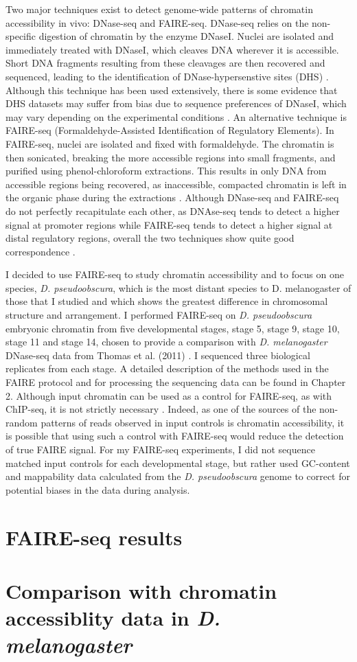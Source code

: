 Two major techniques exist to detect genome-wide patterns of chromatin accessibility in vivo: DNase-seq and FAIRE-seq. DNase-seq relies on the non-specific digestion of chromatin by the enzyme DNaseI. Nuclei are isolated and immediately treated with DNaseI, which cleaves DNA wherever it is accessible. Short DNA fragments resulting from these cleavages are then recovered and sequenced, leading to the identification of DNase-hypersenstive sites (DHS) \citep{thomas_dynamic_2011}. Although this technique has been used extensively, there is some evidence that DHS datasets may suffer from bias due to sequence preferences of DNaseI, which may vary depending on the experimental conditions \citep{koohy_chromatin_2013}. An alternative technique is FAIRE-seq (Formaldehyde-Assisted Identification of Regulatory Elements). In FAIRE-seq, nuclei are isolated and fixed with formaldehyde. The chromatin is then sonicated, breaking the more accessible regions into small fragments, and purified using phenol-chloroform extractions. This results in only DNA from accessible regions being recovered, as inaccessible, compacted chromatin is left in the organic phase during the extractions \citep{giresi_isolation_2009,simon_using_2012}. Although DNase-seq and FAIRE-seq do not perfectly recapitulate each other, as DNAse-seq tends to detect a higher signal at promoter regions while FAIRE-seq tends to detect a higher signal at distal regulatory regions, overall the two techniques show quite good correspondence \citep{koohy_chromatin_2013,mckay_common_2013}.
   
I decided to use FAIRE-seq to study chromatin accessibility and to focus on one species, \emph{D. pseudoobscura}, which is the most distant species to D. melanogaster of those that I studied and which shows the greatest difference in chromosomal structure and arrangement. %
I performed FAIRE-seq on \emph{D. pseudoobscura} embryonic chromatin from five developmental stages, stage 5, stage 9, stage 10, stage 11 and stage 14, chosen to provide a comparison with \emph{D. melanogaster} DNase-seq data from Thomas et al. (2011) \nocite{thomas_dynamic_2011}. I sequenced three biological replicates from each stage. A detailed description of the methods used in the FAIRE protocol and for processing the sequencing data can be found in Chapter 2. Although input chromatin can be used as a control for FAIRE-seq, as with ChIP-seq, it is not strictly necessary \citep{simon_using_2012}. Indeed, as one of the sources of the non-random patterns of reads observed in input controls is chromatin accessibility, it is possible that using such a control with FAIRE-seq would reduce the detection of true FAIRE signal. For my FAIRE-seq experiments, I did not sequence matched input controls for each developmental stage, but rather used GC-content and mappability data calculated from the \emph{D. pseudoobscura} genome to correct for potential biases in the data during analysis.

\section{FAIRE-seq results}

\section{Comparison with chromatin accessiblity data in \emph{D. melanogaster}}

\hrulefill


